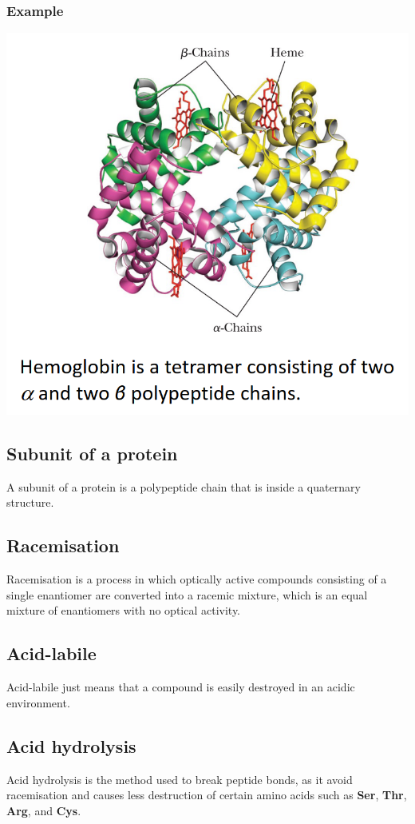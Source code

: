 \documentclass[11pt]{article}
\begin{document}
\subsubsection{Example}
\label{sec:orgb4c64fc}
\begin{center}
\includegraphics[width=.9\linewidth]{./images/hemoglobin.png}
\end{center}
\subsection{Subunit of a protein}
\label{sec:org044c5fe}
A subunit of a protein is a polypeptide chain that is inside a quaternary structure.
\subsection{Racemisation}
\label{sec:org06bf372}
Racemisation is a process in which optically active compounds consisting of a single enantiomer are converted into a racemic mixture, which is an equal mixture of enantiomers with no optical activity.
\subsection{Acid-labile}
\label{sec:orgc41f539}
Acid-labile just means that a compound is easily destroyed in an acidic environment.
\subsection{Acid hydrolysis}
\label{sec:org94fee92}
Acid hydrolysis is the method used to break peptide bonds, as it avoid racemisation and causes less destruction of certain amino acids such as \textbf{Ser}, \textbf{Thr}, \textbf{Arg}, and \textbf{Cys}.
\end{document}
